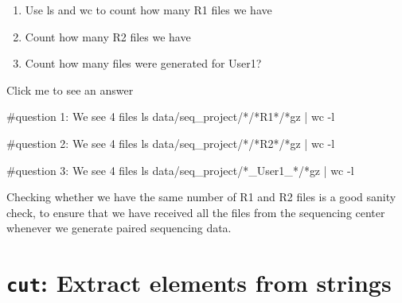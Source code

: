 \documentclass[
  letterpaper,
  DIV=11,
  numbers=noendperiod]{scrreprt}
\newenvironment{Shaded}{}{}
\newcommand{\AttributeTok}[1]{\textcolor[rgb]{0.84,0.23,0.29}{#1}}
\newcommand{\CommentTok}[1]{\textcolor[rgb]{0.42,0.45,0.49}{#1}}
\newcommand{\FunctionTok}[1]{\textcolor[rgb]{0.44,0.26,0.76}{#1}}
\newcommand{\KeywordTok}[1]{\textcolor[rgb]{0.84,0.23,0.29}{#1}}
\newcommand{\NormalTok}[1]{\textcolor[rgb]{0.14,0.16,0.18}{#1}}
\newcommand{\PreprocessorTok}[1]{\textcolor[rgb]{0.84,0.23,0.29}{#1}}
\providecommand{\tightlist}{%
  \setlength{\itemsep}{0pt}\setlength{\parskip}{0pt}}\usepackage{longtable,booktabs,array}
\begin{document}
\begin{tcolorbox}[enhanced jigsaw, rightrule=.15mm, colbacktitle=quarto-callout-caution-color!10!white, colframe=quarto-callout-caution-color-frame, colback=white, arc=.35mm, opacitybacktitle=0.6, coltitle=black, bottomtitle=1mm, breakable, bottomrule=.15mm, leftrule=.75mm, titlerule=0mm, title=\textcolor{quarto-callout-caution-color}{\faFire}\hspace{0.5em}{Exercise}, toprule=.15mm, toptitle=1mm, opacityback=0, left=2mm]

\begin{enumerate}
\def\labelenumi{\arabic{enumi}.}
\tightlist
\item
  Use ls and wc to count how many R1 files we have
\item
  Count how many R2 files we have
\item
  Count how many files were generated for User1?
\end{enumerate}

Click me to see an answer

\begin{Shaded}
\begin{Highlighting}[]
\CommentTok{\#question 1: We see 4 files}
\FunctionTok{ls}\NormalTok{ data/seq\_project/}\PreprocessorTok{*}\NormalTok{/}\PreprocessorTok{*}\NormalTok{R1}\PreprocessorTok{*}\NormalTok{/}\PreprocessorTok{*}\NormalTok{gz }\KeywordTok{|} \FunctionTok{wc} \AttributeTok{{-}l} 

\CommentTok{\#question 2: We see 4 files}
\FunctionTok{ls}\NormalTok{ data/seq\_project/}\PreprocessorTok{*}\NormalTok{/}\PreprocessorTok{*}\NormalTok{R2}\PreprocessorTok{*}\NormalTok{/}\PreprocessorTok{*}\NormalTok{gz }\KeywordTok{|} \FunctionTok{wc} \AttributeTok{{-}l} 

\CommentTok{\#question 3: We see 4 files}
\FunctionTok{ls}\NormalTok{ data/seq\_project/}\PreprocessorTok{*}\NormalTok{\_User1\_}\PreprocessorTok{*}\NormalTok{/}\PreprocessorTok{*}\NormalTok{gz }\KeywordTok{|} \FunctionTok{wc} \AttributeTok{{-}l} 
\end{Highlighting}
\end{Shaded}

Checking whether we have the same number of R1 and R2 files is a good
sanity check, to ensure that we have received all the files from the
sequencing center whenever we generate paired sequencing data.

\end{tcolorbox}

\section{\texorpdfstring{\texttt{cut}: Extract elements from
strings}{cut: Extract elements from strings}}\label{cut-extract-elements-from-strings}
\end{document}
